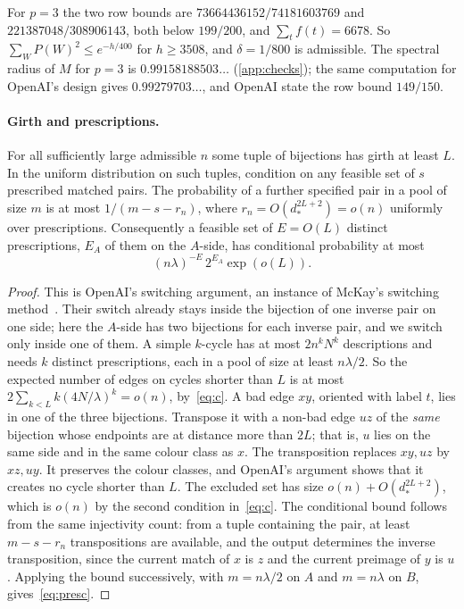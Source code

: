 \documentclass[11pt]{article}
\theoremstyle{definition}
\theoremstyle{plain}
\begin{document}
For $p=3$ the two row bounds are $73664436152/74181603769$ and $221387048/308906143$, both below $199/200$, and $\sum_tf(t)=6678$. So $\sum_WP(W)^2\le e^{-h/400}$ for $h\ge3508$, and $\delta=1/800$ is admissible. The spectral radius of $M$ for $p=3$ is $0.99158188503\ldots$ (\cref{app:checks}); the same computation for OpenAI's design gives $0.99279703\ldots$, and OpenAI state the row bound $149/150$.

\paragraph{Girth and prescriptions.}

\begin{lemma}\label{lem:prescriptions}
For all sufficiently large admissible $n$ some tuple of bijections has girth at least $L$. In the uniform distribution on such tuples, condition on any feasible set of $s$ prescribed matched pairs. The probability of a further specified pair in a pool of size $m$ is at most $1/(m-s-r_n)$, where $r_n=O(d_*^{2L+2})=o(n)$ uniformly over prescriptions. Consequently a feasible set of $E=O(L)$ distinct prescriptions, $E_A$ of them on the $A$-side, has conditional probability at most
\begin{equation}\label{eq:presc}
(n\lambda)^{-E}\,2^{E_A}\exp(o(L)).
\end{equation}
\end{lemma}

\begin{proof}
This is OpenAI's switching argument, an instance of McKay's switching method~\cite{McKay1981,McKayWormald1991}. Their switch already stays inside the bijection of one inverse pair on one side; here the $A$-side has two bijections for each inverse pair, and we switch only inside one of them. A simple $k$-cycle has at most $2n^kN^k$ descriptions and needs $k$ distinct prescriptions, each in a pool of size at least $n\lambda/2$. So the expected number of edges on cycles shorter than $L$ is at most $2\sum_{k<L}k(4N/\lambda)^k=o(n)$, by~\eqref{eq:c}. A bad edge $xy$, oriented with label $t$, lies in one of the three bijections. Transpose it with a non-bad edge $uz$ of the \emph{same} bijection whose endpoints are at distance more than $2L$; that is, $u$ lies on the same side and in the same colour class as $x$. The transposition replaces $xy,uz$ by $xz,uy$. It preserves the colour classes, and OpenAI's argument shows that it creates no cycle shorter than $L$. The excluded set has size $o(n)+O(d_*^{2L+2})$, which is $o(n)$ by the second condition in~\eqref{eq:c}. The conditional bound follows from the same injectivity count: from a tuple containing the pair, at least $m-s-r_n$ transpositions are available, and the output determines the inverse transposition, since the current match of $x$ is $z$ and the current preimage of $y$ is $u$. Applying the bound successively, with $m=n\lambda/2$ on $A$ and $m=n\lambda$ on $B$, gives~\eqref{eq:presc}.
\end{proof}
\end{document}
